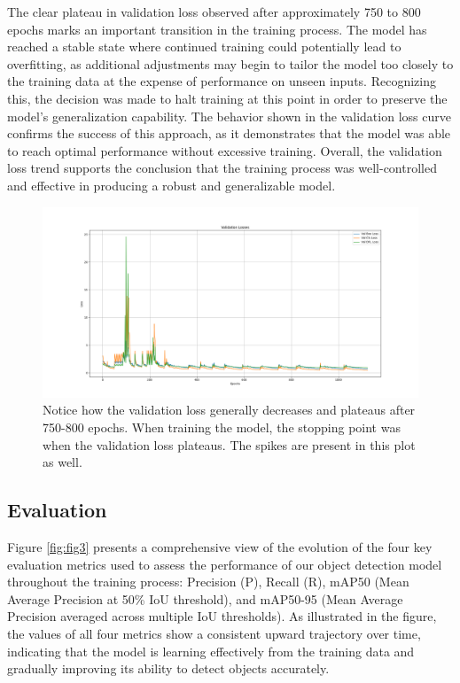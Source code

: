\documentclass[conference]{IEEEtran}
\begin{document}
The clear plateau in validation loss observed after approximately 750 to 800 epochs marks an important transition in the training process. The model has reached a stable state where continued training could potentially lead to overfitting, as additional adjustments may begin to tailor the model too closely to the training data at the expense of performance on unseen inputs. Recognizing this, the decision was made to halt training at this point in order to preserve the model’s generalization capability. The behavior shown in the validation loss curve confirms the success of this approach, as it demonstrates that the model was able to reach optimal performance without excessive training. Overall, the validation loss trend supports the conclusion that the training process was well-controlled and effective in producing a robust and generalizable model.


\begin{figure}[h]
    \centering
    \includegraphics[scale=0.2]{Figure_2.png}
    \caption{
        Notice how the validation loss generally decreases and plateaus after 750-800 epochs. 
        When training the model, 
        the stopping point was when the validation loss plateaus. 
        The spikes are present in this plot as well.    
    }
    \label{fig:fig2}
\end{figure}

\subsection{Evaluation}

Figure \ref{fig:fig3} presents a comprehensive view of the evolution of the four key evaluation metrics used to assess the performance of our object detection model throughout the training process: Precision (P), Recall (R), mAP50 (Mean Average Precision at 50\% IoU threshold), and mAP50-95 (Mean Average Precision averaged across multiple IoU thresholds). As illustrated in the figure, the values of all four metrics show a consistent upward trajectory over time, indicating that the model is learning effectively from the training data and gradually improving its ability to detect objects accurately.
\end{document}

